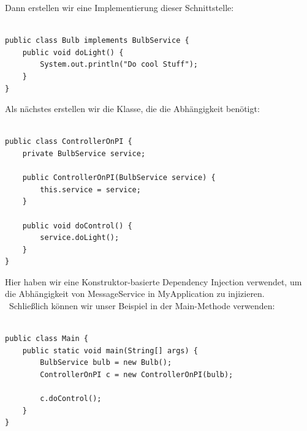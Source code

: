 Dann erstellen wir eine Implementierung dieser Schnittstelle:\\
\noindent\begin{minipage}{\textwidth}
\begin{lstlisting}[caption={Schnittstellenimplementierung},captionpos=b,label={lst:di-interface-implementation}]

public class Bulb implements BulbService {
    public void doLight() {
        System.out.println("Do cool Stuff");
    }
}
\end{lstlisting}
\end{minipage}

Als nächstes erstellen wir die Klasse, die die Abhängigkeit benötigt:\\
\noindent\begin{minipage}{\textwidth}
\begin{lstlisting}[caption={Dependency},captionpos=b,label={lst:di-dependency}]

public class ControllerOnPI {
    private BulbService service;
    
    public ControllerOnPI(BulbService service) {
        this.service = service;
    }
    
    public void doControl() {
        service.doLight();
    }
}
\end{lstlisting}
\end{minipage}
Hier haben wir eine Konstruktor-basierte Dependency Injection verwendet, um die Abhängigkeit von MessageService in MyApplication zu injizieren.
\\\
Schließlich können wir unser Beispiel in der Main-Methode verwenden:\\\\
\noindent\begin{minipage}{\textwidth}
\begin{lstlisting}[caption={Die DI Main},captionpos=b,label={lst:di-main}]
public class Main {
    public static void main(String[] args) {
        BulbService bulb = new Bulb();
        ControllerOnPI c = new ControllerOnPI(bulb);
        
        c.doControl();
    }
}
\end{lstlisting}
\end{minipage}

